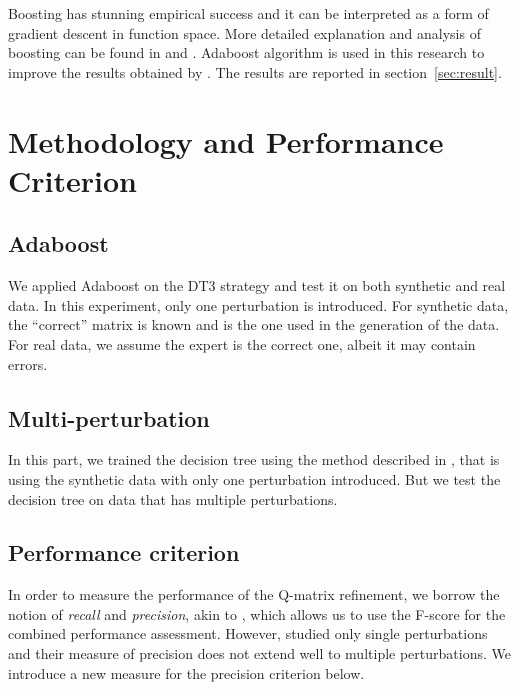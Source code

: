 \documentclass{edm_template}
\begin{document}
Boosting has stunning empirical success\cite{caruana2006empirical} and it can be interpreted as a form of gradient descent in function space\cite{breiman1998arcing}. More detailed explanation and analysis of boosting can be found in and . Adaboost algorithm is used in this research to improve the results obtained by . The results are reported in section~\ref{sec:result}.

\section{Methodology and Performance Criterion}
\subsection{Adaboost}
We applied Adaboost on the DT3 strategy and test it on both synthetic and real data. In this experiment, only one perturbation is introduced.  For synthetic data, the ``correct'' matrix is known and is the one used in the generation of the data.  For real data, we assume the expert is the correct one, albeit it may contain errors.
\subsection{Multi-perturbation}
In this part, we trained the decision tree using the method described in , that is using the synthetic data with only one perturbation introduced. But we test the decision tree on data that has multiple perturbations.
\subsection{Performance criterion}
In order to measure the performance of the Q-matrix refinement, we borrow the notion of \textit{recall} and \textit{precision}, akin to , which allows us to use the F-score for the combined performance assessment. However,  studied only single perturbations and their measure of precision does not extend well to multiple perturbations. We introduce a new measure for the precision criterion below.
\end{document}
